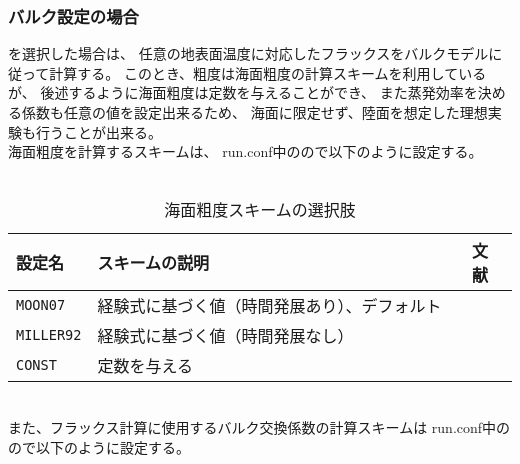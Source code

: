 \subsubsection{バルク設定の場合}
を選択した場合は、
任意の地表面温度に対応したフラックスをバルクモデルに従って計算する。
このとき、粗度は海面粗度の計算スキームを利用しているが、
後述するように海面粗度は定数を与えることができ、
また蒸発効率を決める係数も任意の値を設定出来るため、
海面に限定せず、陸面を想定した理想実験も行うことが出来る。\\

海面粗度を計算するスキームは、
run.conf中のので以下のように設定する。\\

\\

\begin{table}[h]
\begin{center}
  \caption{海面粗度スキームの選択肢}
  \label{tab:nml_roughness}
  \begin{tabularx}{150mm}{llX} \hline
    \rowcolor[gray]{0.9}  設定名 & スキームの説明 & 文献 \\ \hline
      \verb|MOON07|   & 経験式に基づく値（時間発展あり）、デフォルト　& \citet{moon_2007} \\
      \verb|MILLER92| & 経験式に基づく値（時間発展なし）　　　　　　　& \citet{miller_1992} \\
      \verb|CONST|    & 定数を与える & \\
    \hline
  \end{tabularx}
\end{center}
\end{table}

~\\
また、フラックス計算に使用するバルク交換係数の計算スキームは
run.conf中のので以下のように設定する。\\

\\


